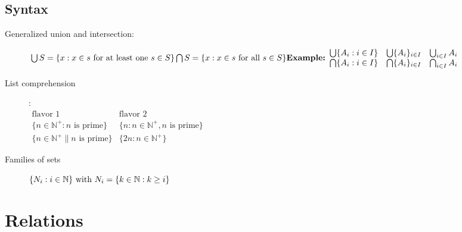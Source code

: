 \documentclass[12pt]{article}
\begin{document}
\subsection{Syntax}
\begin{description}
\item[Generalized union and intersection:]
\begin {math} \\
\bigcup S = \{x: x \in s \textrm{ for at least one } s \in S \} \\
\bigcap S = \{x: x \in s \textrm{ for all } s \in S \} \\ \\
\textbf{Example:}\\ \begin{array}{ccc} 
\bigcup\{A_i : i \in I\} & \bigcup\{A_i\}_{i \in I} & \bigcup_{i \in I}  A_i \\
\bigcap\{A_i : i \in I\} & \bigcap\{A_i\}_{i \in I} & \bigcap_{i \in I}  A_i 
\end{array}
\end {math} 

\item[List comprehension]: \\ \begin {math} \begin{array}{cc} 
\textrm{flavor 1} & \textrm{flavor 2} \\
\{ n \in \mathbb{N}^{+} : n \textrm{ is prime} \} & \{ n: n \in \mathbb{N}^{+} , n \textrm{ is prime} \} \\
\{ n \in \mathbb{N}^{+} \| n \textrm{ is prime} \} & \{2n: n \in \mathbb{N}^{+} \} 
\end{array}
\end {math} \\

\item[Families of sets] 
\begin {math} \\
\{ N_i : i \in \mathbb{N} \} \textrm{ with } N_i = \{ k \in \mathbb{N} : k \geq i\}
\end {math}
\end{description}


\section{Relations}
\end{document}
